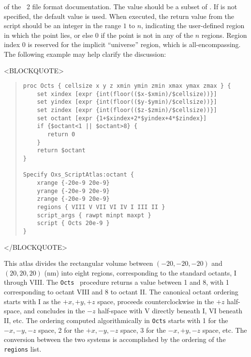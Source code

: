 \begin{description}
 of the
\MIF~2 file format documentation.  The value 
should be a subset of .  If
 is not specified, the default value  is
used.  When executed, the return value from the script should be an
integer in the range $1$ to $n$, indicating the user-defined region in
which the point lies, or else $0$ if the point is not in any
of the $n$ regions.  Region index $0$ is reserved for the implicit
``universe'' region, which is all-encompassing.  The following example
may help clarify the discussion:
\begin{rawhtml}<BLOCKQUOTE>\end{rawhtml}
\begin{quote}
\begin{verbatim}
proc Octs { cellsize x y z xmin ymin zmin xmax ymax zmax } {
    set xindex [expr {int(floor(($x-$xmin)/$cellsize))}]
    set yindex [expr {int(floor(($y-$ymin)/$cellsize))}]
    set zindex [expr {int(floor(($z-$zmin)/$cellsize))}]
    set octant [expr {1+$xindex+2*$yindex+4*$zindex}]
    if {$octant<1 || $octant>8} {
       return 0
    }
    return $octant
}

Specify Oxs_ScriptAtlas:octant {
    xrange {-20e-9 20e-9}
    yrange {-20e-9 20e-9}
    zrange {-20e-9 20e-9}
    regions { VIII V VII VI IV I III II }
    script_args { rawpt minpt maxpt }
    script { Octs 20e-9 }
}
\end{verbatim}
\end{quote}
\begin{rawhtml}</BLOCKQUOTE>\end{rawhtml}
This atlas divides the rectangular volume between $(-20,-20,-20)$ and
$(20,20,20)$ (nm) into eight regions, corresponding to the standard
octants, I through VIII.  The \texttt{Octs} \Tcl\ procedure returns a
value between 1 and 8, with 1 corresponding to octant VIII and 8 to
octant II.  The canonical octant ordering starts with I as the
$+x,+y,+z$ space, proceeds counterclockwise in the $+z$ half-space, and
concludes in the $-z$ half-space with V directly beneath I, VI beneath
II, etc.  The ordering computed algorithmically in \texttt{Octs}
starts with 1 for the $-x,-y,-z$ space, 2 for the $+x,-y,-z$ space, 3
for the $-x,+y,-z$ space, etc.  The conversion between the two systems
is accomplished by the ordering of the \texttt{regions} list.


\end{description}
